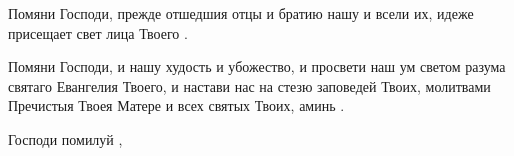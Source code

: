 \begin{mymulticols}
Помяни Господи, прежде отшедшия отцы и братию нашу и всели их, идеже присещает свет лица Твоего . 

Помяни Господи, и нашу худость и убожество, и просвети наш ум светом разума святаго Евангелия Твоего, и настави нас на стезю заповедей Твоих, молитвами Пречистыя Твоея Матере и всех святых Твоих, аминь . 

Господи помилуй ,


\end{mymulticols}

\mychapterending


